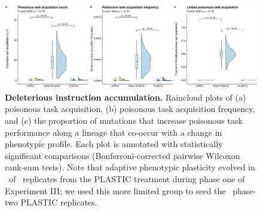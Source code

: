 \begin{figure}[ht!]
    \centering
    \includegraphics[width=1.0\textwidth]{media/poison-accumulation-panel.pdf}
    \caption{\small
    \textbf{Deleterious instruction accumulation.}
    Raincloud plots of 
    (a) poisonous task acquisition,
    (b) poisonous task acquisition frequency,
    and (c) the proportion of mutations that increase poisonous task performance along a lineage that co-occur with a change in phenotypic profile.
    Each plot is annotated with statistically significant comparisons (Bonferroni-corrected pairwise Wilcoxon rank-sum tests).
    Note that adaptive phenotypic plasticity evolved in \deleteriousHitchhikingPlasticReps\ of \deleteriousHitchhikingReplicates\ replicates from the PLASTIC treatment during phase one of Experiment III; we used this more limited group to seed the \deleteriousHitchhikingPlasticReps\ phase-two PLASTIC replicates.
    }
    \label{fig:deleterious-hitchhiking}
\end{figure}